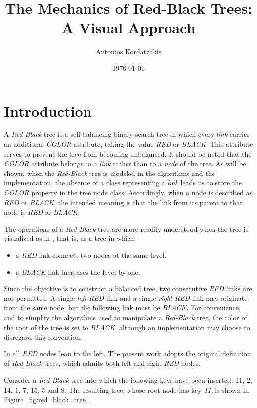\documentclass{article}
\title{The Mechanics of Red-Black Trees: A Visual Approach}
\author{Antonios Kordatzakis}
\date{\today}
\begin{document}
\maketitle

\section{Introduction}

A \emph{Red-Black} tree \cite{bayer, guibas} is a self-balancing binary search tree in which every \emph{link}
carries an additional \emph{COLOR} attribute, taking the value \emph{RED} or \emph{BLACK}.
This attribute serves to prevent the tree from becoming unbalanced.
It should be noted that the \emph{COLOR} attribute belongs to a \emph{link} rather than to a \emph{node} of the tree.
As will be shown, when the \emph{Red-Black} tree is modeled in the algorithms and the implementation,
the absence of a class representing a \emph{link} leads us to store the \emph{COLOR} property in the tree node class.
Accordingly, when a node is described as \emph{RED} or \emph{BLACK},
the intended meaning is that the link from its parent to that node is \emph{RED} or \emph{BLACK}.

\par
The operations of a \emph{Red-Black} tree are more readily understood when the tree is visualized as in
\cite{bayer}, that is, as a tree in which:

\begin{itemize}
    \item a \emph{RED} link connects two nodes at the same level.
    \item a \emph{BLACK} link increases the level by one.
\end{itemize}

Since the objective is to construct a balanced tree, two consecutive \emph{RED} links are not permitted. A single
\emph{left RED} link and a single \emph{right RED} link may originate from the same node, but the following link must be
\emph{BLACK}. For convenience, and to simplify the algorithms used to manipulate a \emph{Red-Black} tree,
the color of the root of the tree is set to \emph{BLACK}, although an implementation may choose to disregard this
convention.

In \cite{llrb, sedgewick} all \emph{RED} nodes lean to the left. The present work adopts the original definition of
\emph{Red-Black} trees, which admits both left and right \emph{RED} nodes.

\par
Consider a \emph{Red-Black} tree into which the following keys have been inserted: 11, 2, 14, 1, 7, 15, 5 and 8.
The resulting tree, whose root node has key \emph{11}, is shown in Figure~\ref{fig:red_black_tree}.
\end{document}
